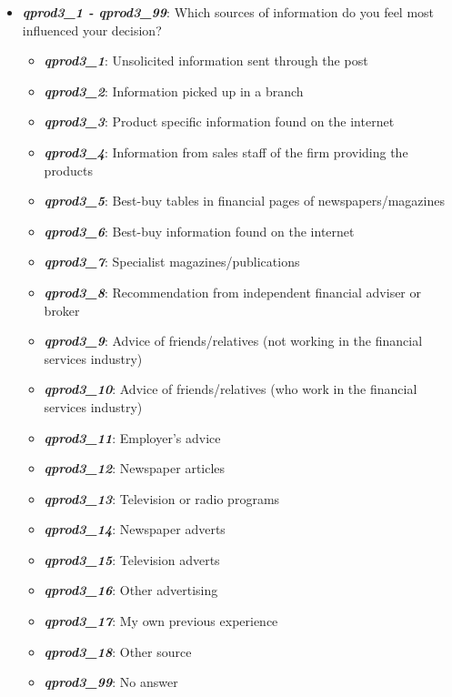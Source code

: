 \documentclass[a4paper,11pt]{article}
\begin{document}
\begin{itemize}
    \item \textit{\textbf{qprod3\_1 - qprod3\_99}}: Which sources of information do you feel most influenced your decision?
    \begin{itemize}
        \item \textit{\textbf{qprod3\_1}}: Unsolicited information sent through the post
        \item \textit{\textbf{qprod3\_2}}: Information picked up in a branch
        \item \textit{\textbf{qprod3\_3}}: Product specific information found on the internet
        \item \textit{\textbf{qprod3\_4}}: Information from sales staff of the firm providing the products
        \item \textit{\textbf{qprod3\_5}}: Best-buy tables in financial pages of newspapers/magazines
        \item \textit{\textbf{qprod3\_6}}: Best-buy information found on the internet
        \item \textit{\textbf{qprod3\_7}}: Specialist magazines/publications
        \item \textit{\textbf{qprod3\_8}}: Recommendation from independent financial adviser or broker
        \item \textit{\textbf{qprod3\_9}}: Advice of friends/relatives (not working in the financial services industry)
        \item \textit{\textbf{qprod3\_10}}: Advice of friends/relatives (who work in the financial services industry)
        \item \textit{\textbf{qprod3\_11}}: Employer’s advice
        \item \textit{\textbf{qprod3\_12}}: Newspaper articles
        \item \textit{\textbf{qprod3\_13}}: Television or radio programs
        \item \textit{\textbf{qprod3\_14}}: Newspaper adverts
        \item \textit{\textbf{qprod3\_15}}: Television adverts
        \item \textit{\textbf{qprod3\_16}}: Other advertising
        \item \textit{\textbf{qprod3\_17}}: My own previous experience
        \item \textit{\textbf{qprod3\_18}}: Other source
        \item \textit{\textbf{qprod3\_99}}: No answer
    \end{itemize}


\end{itemize}
\end{document}
